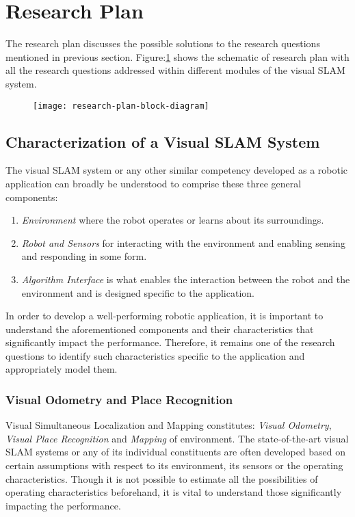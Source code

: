 \documentclass{article}
\begin{document}
\section{Research Plan}
The research plan discusses the possible solutions to the research questions mentioned in previous section. Figure:\ref{fig:researchPlan} shows the schematic of research plan with all the research questions addressed within different modules of the visual SLAM system.

\begin{figure}
 \centering
 \texttt{[image: research-plan-block-diagram]}
 \label{fig:researchPlan}
\end{figure}

\subsection{Characterization of a Visual SLAM System}
The visual SLAM system or any other similar competency developed as a robotic application can broadly be understood to comprise these three general components:
\begin{enumerate}
 \item \emph{Environment} where the robot operates or learns about its surroundings.
 \item \emph{Robot and Sensors} for interacting with the environment and enabling sensing and responding in some form.
 \item \emph{Algorithm Interface} is what enables the interaction between the robot and the environment and is designed specific to the application.
\end{enumerate}

In order to develop a well-performing robotic application, it is important to understand the aforementioned components and their characteristics that significantly impact the performance. Therefore, it remains one of the research questions to identify such characteristics specific to the application and appropriately model them.

\subsubsection{Visual Odometry and Place Recognition}
Visual Simultaneous Localization and Mapping constitutes: \emph{Visual Odometry}, \emph{Visual Place Recognition} and \emph{Mapping} of environment. The state-of-the-art visual SLAM systems or any of its individual constituents are often developed based on certain assumptions with respect to its environment, its sensors or the operating characteristics. Though it is not possible to estimate all the possibilities of operating characteristics beforehand, it is vital to understand those significantly impacting the performance.
\end{document}

